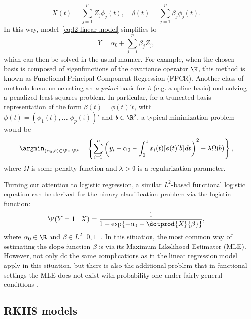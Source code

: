 \[
  X(t)=\sum_{j=1}^p Z_j \phi_j(t), \quad \beta(t) = \sum_{j=1}^p \beta_j \phi_j(t).
\]
In this way, model~\eqref{eq:l2-linear-model} simplifies to
\[
Y = \alpha_0 + \sum_{j=1}^p \beta_j Z_j,
\]
which can then be solved in the usual manner. For example, when the chosen basis is composed of eigenfunctions of the covariance operator \(\K\), this method is known as Functional Principal Component Regression (FPCR). Another class of methods focus on selecting an \textit{a priori} basis for \(\beta\) (e.g. a spline basis) and solving a penalized least squares problem. In particular, for a truncated basis representation of the form \(\beta(t)=\phi(t)'b\), with \(\phi(t)=(\phi_1(t), \dots, \phi_p(t))'\) and \(b\in\R^p\), a typical minimization problem would be
\[
\argmin_{(\alpha_0, b)\in\R\times\R^p} \ \ \ \left\{ \sum_{i=1}^n \left( y_i - \alpha_0 - \int_0^1 x_i(t)[\phi(t)'b]\, dt\right)^2 + \lambda \Omega(b) \right\},
\]
where \(\Omega\) is some penalty function and \(\lambda>0\) is a regularization parameter.

Turning our attention to logistic regression, a similar \(L^2\)-based functional logistic equation can be derived for the binary classification problem via the logistic function:
\begin{equation}\label{eq:l2-logistic-model}
  \P(Y=1 \mid X) = \frac{1}{1 + \exp\{-\alpha_0 - \dotprod{X}{\beta}\}},
\end{equation}
where \(\alpha_0 \in \R\) and \(\beta \in L^2[0, 1]\). In this situation, the most common way of estimating the slope function \(\beta\) is via its Maximum Likelihood Estimator (MLE). However, not only do the same complications as in the linear regression model apply in this situation, but there is also the additional problem that in functional settings the MLE does not exist with probability one under fairly general conditions \citep[see][]{berrendero2023functional}.

\subsection*{RKHS models}

